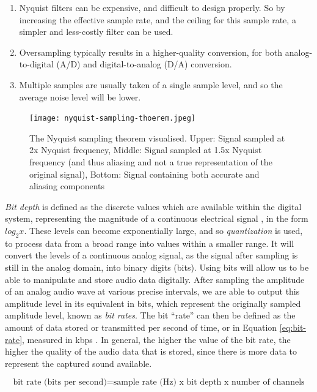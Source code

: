 \begin{enumerate}
	\item Nyquist filters can be expensive, and difficult to design properly. So by increasing the effective sample rate, and the ceiling for this sample rate, a simpler and less-costly filter can be used.
	\item Oversampling typically results in a higher-quality conversion, for both analog-to-digital (A/D) and digital-to-analog (D/A) conversion.
	\item Multiple samples are usually taken of a single sample level, and so the average noise level will be lower.
\end{enumerate}

\begin{figure}[ht]
  \centering
  \texttt{[image: nyquist-sampling-thoerem.jpeg]}
  \caption{The Nyquist sampling theorem visualised. Upper: Signal sampled at 2x Nyquist frequency, Middle: Signal sampled at 1.5x Nyquist frequency (and thus aliasing and not a true representation of the original signal), Bottom: Signal containing both accurate and aliasing components}\cite{Zjalic_2021}
  \label{fig:nyquist-sampling-theorem}
\end{figure}

\textit{Bit depth} is defined as the discrete values which are available within the digital system, representing the magnitude of a continuous electrical signal \cite{Zjalic_2021}, in the form $log_2{x}$. These levels can become exponentially large, and so \textit{quantization} is used, to process data from a broad range into values within a smaller range. It will convert the levels of a continuous analog signal, as the signal after sampling is still in the analog domain, into binary digits (bits). Using bits will allow us to be able to manipulate and store audio data digitally. After sampling the amplitude of an analog audio wave at various precise intervals, we are able to output this amplitude level in its equivalent in bits, which represent the originally sampled amplitude level, known as \textit{bit rates}. The bit ``rate'' can then be defined as the amount of data stored or transmitted per second of time, or in Equation \ref{eq:bit-rate}, measured in kbps \cite{Zjalic_2021}. In general, the higher the value of the bit rate, the higher the quality of the audio data that is stored, since there is more data to represent the captured sound available.

\begin{equation}
	\textrm{bit rate (bits per second)} = \textrm{sample rate (Hz) x } \textrm{bit depth x } \textrm{number of channels}
	\label{eq:bit-rate}	
\end{equation}

